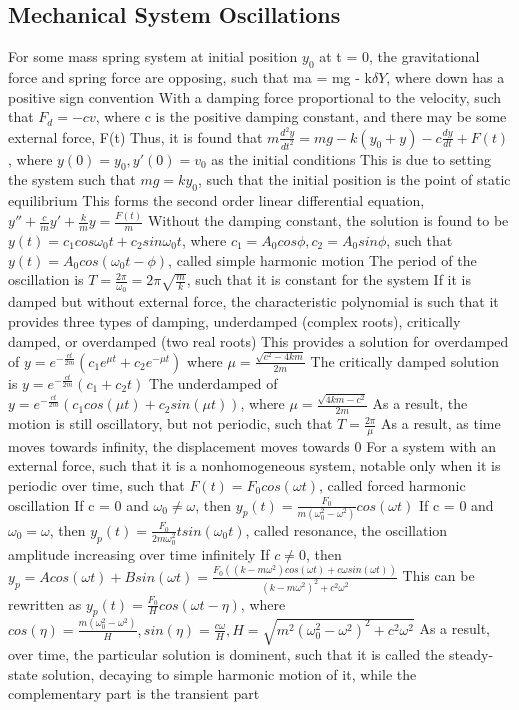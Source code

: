 \documentclass[11 pt, twoside]{article}
\newenvironment{outline*}
{
	\begin{outline}[enumerate]
	}
	{\end{outline}
}
\begin{document}
\subsection{Mechanical System Oscillations}
\begin{outline*}
\1 For some mass spring system at initial position $y_0$ at t = 0, the gravitational force and spring force are opposing, such that ma = mg - k$\delta Y$, where down has a positive sign convention
\2 With a damping force proportional to the velocity, such that $F_d = -cv$, where c is the positive damping constant, and there may be some external force, F(t)
\2 Thus, it is found that $m\frac{d^2y}{dt^2} = mg - k(y_0 + y) - c\frac{dy}{dt} + F(t)$, where $y(0) = y_0, y'(0) = v_0$ as the initial conditions
\3 This is due to setting the system such that $mg = ky_0$, such that the initial position is the point of static equilibrium
\3 This forms the second order linear differential equation, $y'' + \frac{c}{m}y' + \frac{k}{m}y = \frac{F(t)}{m}$
\1 Without the damping constant, the solution is found to be $y(t) = c_1cos\omega_0t + c_2sin\omega_0t$, where $c_1 = A_0cos\phi, c_2 = A_0sin\phi$, such that $y(t) = A_0cos(\omega_0t - \phi)$, called simple harmonic motion
\2 The period of the oscillation is $T = \frac{2\pi}{\omega_0} = 2\pi\sqrt{\frac{m}{k}}$, such that it is constant for the system
\1 If it is damped but without external force, the characteristic polynomial is such that it provides three types of damping, underdamped (complex roots), critically damped, or overdamped (two real roots)
\2 This provides a solution for overdamped of $y = e^{-\frac{ct}{2m}}(c_1e^{\mu t} + c_2e^{-\mu t})$ where $\mu = \frac{\sqrt{c^2 - 4km}}{2m}$
\2 The critically damped solution is  $y = e^{-\frac{ct}{2m}}(c_1 + c_2t)$
\2 The underdamped of $y = e^{-\frac{ct}{2m}}(c_1cos(\mu t) + c_2sin(\mu t))$, where $\mu = \frac{\sqrt{4km - c^2}}{2m}$
\3 As a result, the motion is still oscillatory, but not periodic, such that $T = \frac{2\pi}{\mu}$
\2 As a result, as time moves towards infinity, the displacement moves towards 0
\1 For a system with an external force, such that it is a nonhomogeneous system, notable only when it is periodic over time, such that $F(t) = F_0cos(\omega t)$, called forced harmonic oscillation
\2 If c = 0 and $\omega_0 \neq \omega$, then $y_p(t) = \frac{F_0}{m(\omega_0^2 - \omega^2)}cos(\omega t)$
\2 If c = 0 and $\omega_0 = \omega$, then $y_p(t) = \frac{F_0}{2m\omega_0^2}tsin(\omega_0 t)$, called resonance, the oscillation amplitude increasing over time infinitely
\2 If $c \neq 0$, then $y_p = Acos(\omega t) + Bsin(\omega t) = \frac{F_0((k - m\omega^2)cos(\omega t) + c\omega sin(\omega t))}{(k - m\omega^2)^2 + c^2\omega^2}$
\3 This can be rewritten as $y_p(t) = \frac{F_0}{H}cos(\omega t - \eta)$, where $cos(\eta) = \frac{m(\omega_0^2 - \omega^2)}{H}, sin(\eta) = \frac{c\omega}{H}, H = \sqrt{m^2(\omega^2_0 - \omega^2)^2 + c^2\omega^2}$
\3 As a result, over time, the particular solution is dominent, such that it is called the steady-state solution, decaying to simple harmonic motion of it, while the complementary part is the transient part
\end{outline*}
\end{document}

